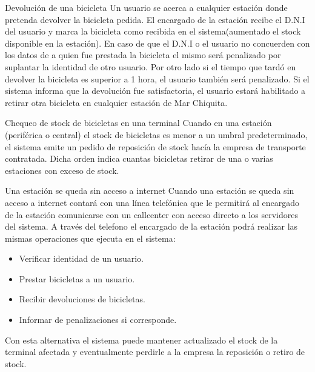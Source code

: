 \begin{subsection}{Devolución de una bicicleta}
Un usuario se acerca a cualquier estación donde pretenda devolver la bicicleta pedida. El encargado de la estación
recibe el D.N.I del usuario y marca la bicicleta como recibida en el sistema(aumentado el stock disponible en la estación). En caso de que el D.N.I o el usuario no concuerden con los datos de a quien fue prestada la bicicleta el mismo será penalizado por suplantar la identidad de otro usuario. Por otro lado si el tiempo que tardó en devolver la bicicleta es superior a 1 hora, el usuario también será penalizado. Si el sistema informa que la devolución fue satisfactoria, el usuario estará habilitado a retirar otra bicicleta en cualquier estación de Mar Chiquita.

\end{subsection}

\begin{subsection}{Chequeo de stock de bicicletas en una terminal}
Cuando en una estación (periférica o central) el stock de bicicletas es menor a un umbral predeterminado, el sistema
emite un pedido de reposición de stock hacía la empresa de transporte contratada. Dicha orden indica cuantas 
bicicletas retirar de una o varias estaciones con exceso de stock.

\end{subsection}

\begin{subsection}{Una estación se queda sin acceso a internet}
Cuando una estación se queda sin acceso a internet contará con una línea telefónica que le permitirá al encargado 
de la estación comunicarse con un callcenter con acceso directo a los servidores del sistema. A través del telefono
el encargado de la estación podrá realizar las mismas operaciones que ejecuta en el sistema:
	\begin{itemize}
	\item Verificar identidad de un usuario.
	\item Prestar bicicletas a un usuario.
	\item Recibir devoluciones de bicicletas.
	\item Informar de penalizaciones si corresponde.
	\end{itemize}
	
Con esta alternativa el sistema puede mantener actualizado el stock de la terminal afectada y eventualmente perdirle a la empresa la reposición o retiro de stock.

\end{subsection}

